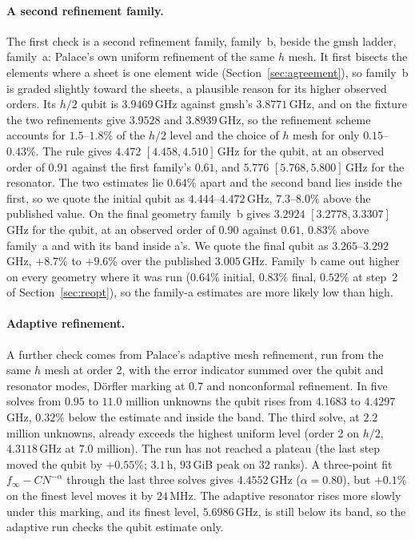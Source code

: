 \documentclass{anvil-paper}
\begin{document}
\paragraph{A second refinement family.}
The first check is a second refinement family, family~b, beside the gmsh
ladder, family~a: Palace's own uniform refinement of the same $h$ mesh. It
first bisects the elements where a sheet is one element wide
(Section~\ref{sec:agreement}), so family~b is graded slightly toward the
sheets, a plausible reason for its higher observed orders. Its $h/2$ qubit is $3.9469$\,GHz against
gmsh's $3.8771$\,GHz, and on the fixture the two refinements give $3.9528$
and $3.8939$\,GHz, so the refinement scheme accounts for $1.5$--$1.8\%$ of
the $h/2$ level and the choice of $h$ mesh for only $0.15$--$0.43\%$. The
rule gives $4.472$ $[4.458, 4.510]$\,GHz for the qubit, at an observed order
of $0.91$ against the first family's $0.61$, and $5.776$ $[5.768,
5.800]$\,GHz for the resonator. The two estimates lie $0.64\%$ apart and the
second band lies inside the first, so we quote the initial qubit as
$4.444$--$4.472$\,GHz, $7.3$--$8.0\%$ above the published value. On the
final geometry family~b gives $3.2924$ $[3.2778, 3.3307]$\,GHz for the
qubit, at an observed order of $0.90$ against $0.61$, $0.83\%$ above
family~a and with its band inside a's. We quote the final qubit as $3.265$--$3.292$\,GHz,
$+8.7\%$ to $+9.6\%$ over the published $3.005$\,GHz. Family~b came out
higher on every geometry where it was run ($0.64\%$ initial, $0.83\%$
final, $0.52\%$ at step~2 of Section~\ref{sec:reopt}), so the family-a
estimates are more likely low than high.

\paragraph{Adaptive refinement.}
A further check comes from Palace's adaptive mesh refinement, run from the
same $h$ mesh at order 2, with the error indicator summed over the qubit and resonator modes,
D\"orfler marking at $0.7$ and nonconformal refinement. In five solves from
$0.95$ to $11.0$ million unknowns the qubit rises from $4.1683$ to
$4.4297$\,GHz, $0.32\%$ below the estimate and inside the band. The third
solve, at $2.2$ million unknowns, already exceeds the highest uniform level
(order 2 on $h/2$, $4.3118$\,GHz at $7.0$ million). The run has not reached a plateau (the
last step moved the qubit by $+0.55\%$; $3.1$\,h, $93$\,GiB peak on 32
ranks). A three-point fit $f_\infty - CN^{-\alpha}$ through the last three
solves gives $4.4552$\,GHz ($\alpha = 0.80$), but $+0.1\%$ on the finest
level moves it by $24$\,MHz. The adaptive resonator rises more slowly under this
marking, and its finest level, $5.6986$\,GHz, is still below its band, so
the adaptive run checks the qubit estimate only.
\end{document}
